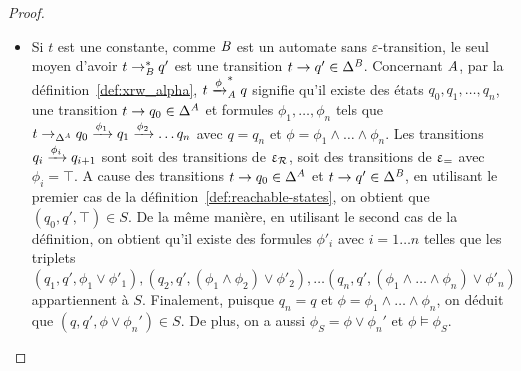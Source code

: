 \begin{proof}
\begin{itemize}
\item Si $t$ est une constante, comme $\mathit B$ est un automate sans $\varepsilon$-transition, le seul
  moyen d'avoir $t \rightarrow^*_\mathit B q'$ est une transition $t \rightarrow q' \in \Delta^\mathit B$. Concernant
  $\mathit A$, par la définition~\ref{def:xrw_alpha}, $t\xrightarrow{\phi}^*_\mathit A q$ signifie
  qu'il existe des états $q_0,q_1, \ldots, q_n$, une transition $t \rightarrow q_0 \in \Delta^\mathit A$ et formules $\phi_1,\ldots,
  \phi_n$ tels que $t \rightarrow_{\Delta^\mathit A} q_0 \xrightarrow{\phi_1} q_1 \xrightarrow{\phi_2}
  \ldots q_n$ avec $q=q_n$ et $\phi=\phi_1\wedge \ldots \wedge
  \phi_n$. %
  Les transitions $q_i \xrightarrow{\phi_i} q_{i+1}$ sont soit des transitions de $\upvarepsilon_{\mathcal R}$, soit
  des transitions de $\upvarepsilon_{=}$ avec $\phi_i=\top$.  A cause des transitions $t \rightarrow q_0
  \in \Delta^\mathit A$ et $t \rightarrow q' \in \Delta^\mathit B$, en utilisant le premier cas de la
  définition~\ref{def:reachable-states}, on obtient que $(q_0,q',\top) \in
  S$. De la même manière, en utilisant le second cas de la définition, on obtient qu'il existe
  des formules $\phi'_i$ avec $i=1\ldots n$ telles que les triplets $(q_1,q', \phi_1\vee
  \phi'_1), (q_2,q',(\phi_1\wedge\phi_2)\vee \phi'_2),\ldots (q_n,q', (\phi_1
  \wedge \ldots \wedge \phi_n)\vee \phi'_n)$ appartiennent à $S$. 
  Finalement, puisque $q_n=q$ et $\phi=\phi_1\wedge \ldots \wedge \phi_n$, on déduit que
  $(q,q',\phi\vee\phi_n') \in S$. De plus, on a aussi $\phi_S=
  \phi\vee \phi_n'$ et $\phi \models \phi_S$. %


\end{itemize}
\end{proof}
